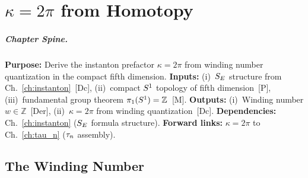 
\chapter{$\kappa = 2\pi$ from Homotopy}
\label{ch:kappa}


\begin{abstract}
Chapter~\ref{ch:instanton} established that the Euclidean action for metastable junction
decay has the form $\SE/\hbar = \kappa \times (L_0/\delta)$. What fixes $\kappa$?
This chapter derives $\kappa = 2\pi$ from the fundamental group of the circle,
$\pione(\Sone) = \mathbb{Z}$. The result is topological: $\kappa$ is not a fit
parameter but a consequence of winding number quantization in the compact
fifth dimension.
\end{abstract}

\paragraph{Chapter Spine.}
\textbf{Purpose:} Derive the instanton prefactor $\kappa = 2\pi$ from winding
number quantization in the compact fifth dimension.
\textbf{Inputs:} (i)~$S_E$ structure from Ch.~\ref{ch:instanton}~[Dc],
(ii)~compact $S^1$ topology of fifth dimension~[P], (iii)~fundamental group theorem $\pione(\Sone) = \mathbb{Z}$~[M].
\textbf{Outputs:} (i)~Winding number $w \in \mathbb{Z}$~[Der],
(ii)~$\kappa = 2\pi$ from winding quantization~[Dc].
\textbf{Dependencies:} Ch.~\ref{ch:instanton} ($S_E$ formula structure).
\textbf{Forward links:} $\kappa = 2\pi$ to Ch.~\ref{ch:tau_n} ($\tau_n$ assembly).

\section{The Winding Number}
\label{sec:kappa:winding}

